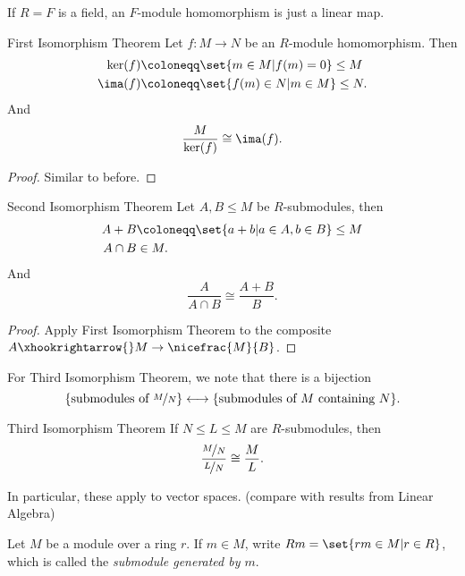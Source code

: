 \begin{example}
    If \(R = F\) is a field, an \(F\)-module homomorphism is just a linear map.
\end{example}
\begin{theorem}{First Isomorphism Theorem}{}
    Let \(f: M \to N\) be an \(R\)-module homomorphism. Then
    \begin{align*}
        \ker(f) &\coloneqq  \set{m\in M | f(m) = 0} \leq M\\
        \ima(f) &\coloneqq \set{f(m) \in N | m \in M} \leq N.
    \end{align*}
    And
    \[
        \frac{M}{\ker(f)}\cong \ima(f).
    \]
\end{theorem}
\begin{proof}
    Similar to before.
\end{proof}
\begin{theorem}{Second Isomorphism Theorem}{}
    Let \(A, B \leq M\) be \(R\)-submodules, then
    \begin{align*}
        A + B &\coloneqq \set{a + b | a\in A, b\in B} \leq M\\
        A \cap B &\in M.
    \end{align*}
    And
    \[
        \frac{A}{A \cap B} \cong \frac{A + B}{B}.
    \]
\end{theorem}
\begin{proof}
    Apply First Isomorphism Theorem to the composite \(A \xhookrightarrow{} M \to \nicefrac{M}{B}\).
\end{proof}
For Third Isomorphism Theorem, we note that there is a bijection
\[
    \{\text{submodules of }\nicefrac{M}{N}\} \longleftrightarrow\{\text{submodules of }M\text{ containing }N\}.
\]
\begin{theorem}{Third Isomorphism Theorem}{}
    If \(N \leq L \leq M\) are \(R\)-submodules, then
    \[
        \frac{\nicefrac{M}{N}}{\nicefrac{L}{N}}\cong \frac{M}{L}.
    \]
\end{theorem}
In particular, these apply to vector spaces. (compare with results from Linear Algebra)

Let \(M\) be a module over a ring \(r\). If \(m \in M\), write \(Rm = \set{rm \in M | r \in R}\), which is called the \textit{submodule generated by \(m\)}.

